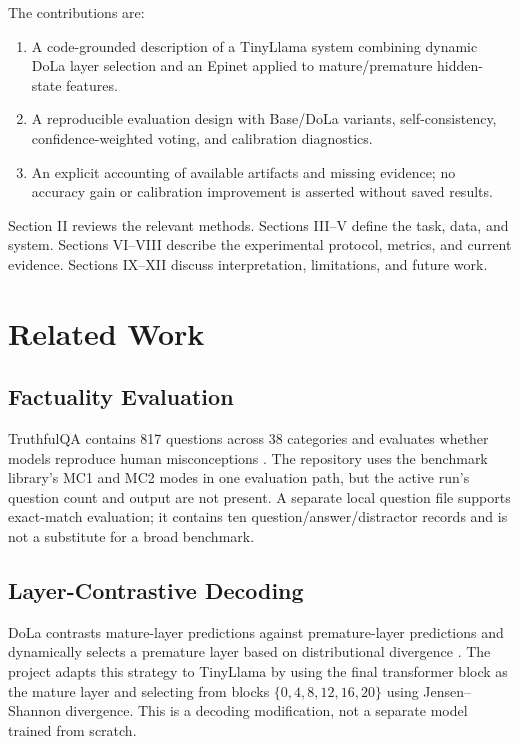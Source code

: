 \documentclass[conference]{IEEEtran}
\begin{document}
The contributions are:
\begin{enumerate}
\item A code-grounded description of a TinyLlama system combining dynamic DoLa layer selection and an Epinet applied to mature/premature hidden-state features.
\item A reproducible evaluation design with Base/DoLa variants, self-consistency, confidence-weighted voting, and calibration diagnostics.
\item An explicit accounting of available artifacts and missing evidence; no accuracy gain or calibration improvement is asserted without saved results.
\end{enumerate}

Section II reviews the relevant methods. Sections III--V define the task, data, and system. Sections VI--VIII describe the experimental protocol, metrics, and current evidence. Sections IX--XII discuss interpretation, limitations, and future work.

\section{Related Work}
\subsection{Factuality Evaluation}
TruthfulQA contains 817 questions across 38 categories and evaluates whether models reproduce human misconceptions \cite{lin2022truthfulqa}. The repository uses the benchmark library's MC1 and MC2 modes in one evaluation path, but the active run's question count and output are not present. A separate local question file supports exact-match evaluation; it contains ten question/answer/distractor records and is not a substitute for a broad benchmark.

\subsection{Layer-Contrastive Decoding}
DoLa contrasts mature-layer predictions against premature-layer predictions and dynamically selects a premature layer based on distributional divergence \cite{chuang2024dola}. The project adapts this strategy to TinyLlama by using the final transformer block as the mature layer and selecting from blocks $\{0,4,8,12,16,20\}$ using Jensen--Shannon divergence. This is a decoding modification, not a separate model trained from scratch.
\end{document}
